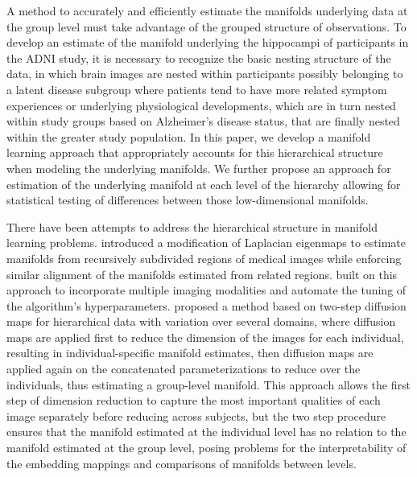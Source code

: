 \documentclass[11pt,reqno]{article}
\theoremstyle{definition}
\begin{document}
A method to accurately and efficiently estimate the manifolds underlying data at the group level must take advantage of the grouped structure of observations. To develop an estimate of the manifold underlying the hippocampi of participants in the ADNI study, it is necessary to recognize the basic nesting structure of the data, in which brain images are nested within participants possibly belonging to a latent disease subgroup where patients tend to have more related symptom experiences or underlying physiological developments, which are in turn nested within study groups based on Alzheimer's disease status, that are finally nested within the greater study population. In this paper, we develop a manifold learning approach that appropriately accounts for this hierarchical structure when modeling the underlying manifolds. We further propose an approach for estimation of the underlying manifold at each level of the hierarchy allowing for statistical testing of differences between those low-dimensional manifolds.

There have been attempts to address the hierarchical structure in manifold learning problems. \cite{bhatiaHierarchicalManifoldLearning2012} introduced a modification of Laplacian eigenmaps to estimate manifolds from recursively subdivided regions of medical images while enforcing similar alignment of the manifolds estimated from related regions. \cite{freicheCharacterizingMyocardialIschemia2022} built on this approach to incorporate multiple imaging modalities and automate the tuning of the algorithm's hyperparameters. \cite{gaoHierarchicalManifoldLearning2019} proposed a method based on two-step diffusion maps for hierarchical data with variation over several domains, where diffusion maps are applied first to reduce the dimension of the images for each individual, resulting in individual-specific manifold estimates, then diffusion maps are applied again on the concatenated parameterizations to reduce over the individuals, thus estimating a group-level manifold. This approach allows the first step of dimension reduction to capture the most important qualities of each image separately before reducing across subjects, but the two step procedure ensures that the manifold estimated at the individual level has no relation to the manifold estimated at the group level, posing problems for the interpretability of the embedding mappings and comparisons of manifolds between levels.
\end{document}

